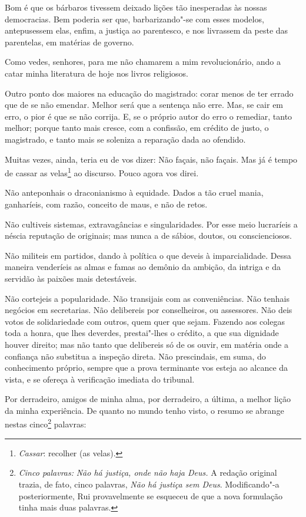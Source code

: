 Bom é que os bárbaros tivessem deixado lições tão inesperadas às
nossas democracias. Bem poderia ser que, barbarizando"-se com esses
modelos, antepusessem elas, enfim, a justiça ao parentesco, e nos
livrassem da peste das parentelas, em matérias de governo.

Como vedes, senhores, para me não chamarem a mim revolucionário,
ando a catar minha literatura de hoje nos livros religiosos.

Outro ponto dos maiores na educação do magistrado: corar menos de
ter errado que de se não emendar. Melhor será que a sentença não erre.
Mas, se cair em erro, o pior é que se não corrija. E, se o próprio
autor do erro o remediar, tanto melhor; porque tanto mais cresce, com a
confissão, em crédito de justo, o magistrado, e tanto mais se soleniza
a reparação dada ao ofendido.

Muitas vezes, ainda, teria eu de vos dizer: Não façais, não
façais. Mas já é tempo de cassar as velas\footnote{\textit{Cassar}: recolher (as velas).} ao discurso. Pouco agora vos direi.

Não anteponhais o draconianismo à equidade. Dados a tão cruel
mania, ganharíeis, com razão, conceito de maus, e não de retos.

Não cultiveis sistemas, extravagâncias e singularidades. Por esse
meio lucraríeis a néscia reputação de originais; mas nunca a de sábios,
doutos, ou conscienciosos.

Não militeis em partidos, dando à política o que deveis à
imparcialidade. Dessa maneira venderíeis as almas e famas ao demônio da
ambição, da intriga e da servidão às paixões mais detestáveis.

Não cortejeis a popularidade. Não transijais com as conveniências.
Não tenhais negócios em secretarias. Não delibereis por conselheiros,
ou assessores. Não deis votos de solidariedade com outros, quem quer
que sejam. Fazendo aos colegas toda a honra, que lhes deverdes,
prestai"-lhes o crédito, a que sua dignidade houver direito; mas não
tanto que delibereis só de os ouvir, em matéria onde a confiança não
substitua a inspeção direta. Não prescindais, em suma, do conhecimento
próprio, sempre que a prova terminante vos esteja ao alcance da vista,
e se ofereça à verificação imediata do tribunal.

Por derradeiro, amigos de minha alma, por derradeiro, a última, a
melhor lição da minha experiência. De quanto no mundo tenho visto, o
resumo se abrange nestas cinco\footnote{\emph{Cinco palavras:} \textit{Não há
justiça, onde não haja Deus.} A redação original trazia, de fato, cinco palavras, \emph{Não há justiça sem Deus}. Modificando"-a posteriormente, Rui provavelmente se esqueceu de que a nova formulação tinha mais duas palavras.} palavras:

